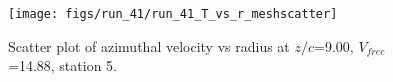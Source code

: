 \begin{figure}[H]
\centering
\texttt{[image: figs/run\_41/run\_41\_T\_vs\_r\_meshscatter]}
\caption{Scatter plot of azimuthal velocity vs radius at $z/c$=9.00, $V_{free}$=14.88, station 5.}
\label{fig:run_41_T_vs_r_meshscatter}
\end{figure}


